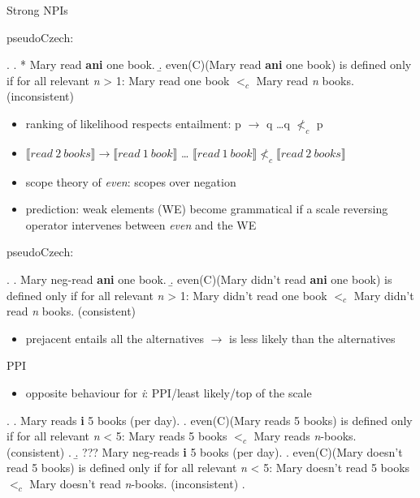 \documentclass[ignorenonframetext,]{beamer}
\providecommand{\tightlist}{%
  \setlength{\itemsep}{0pt}\setlength{\parskip}{0pt}}
\begin{document}
\begin{frame}{Strong NPIs}

pseudoCzech:

\ex. \a. * Mary read \textbf{ani} one book. \b. even(C)(Mary read \textbf{ani} one book) is
defined only if for all relevant \emph{n} \textgreater{} 1: Mary read
one book \(<_c\) Mary read \emph{n} books. \hfill (inconsistent)

\begin{itemize}
\tightlist
\item
  ranking of likelihood respects entailment: p \(\rightarrow\) q
  \ldots q \(\not<_c\) p
\item
  \(\llbracket read\ 2\ books\rrbracket \rightarrow \llbracket read\ 1\ book\rrbracket\)
  \ldots{}
  \(\llbracket read\ 1\ book\rrbracket \not<_c \llbracket read\ 2\ books\rrbracket\)
\end{itemize}

\end{frame}

\begin{frame}

\begin{itemize}
\tightlist
\item
  scope theory of \emph{even}: scopes over negation
\item
  prediction: weak elements (WE) become grammatical if a scale reversing
  operator intervenes between \emph{even} and the WE
\end{itemize}

pseudoCzech:

\ex. \a. Mary neg-read \textbf{ani} one book. \b. even(C)(Mary didn't read \textbf{ani} one 
book) is defined only if for all relevant \emph{n} \textgreater{} 1:
Mary didn't read one book \(<_c\) Mary didn't read \emph{n} books.
\hfill (consistent)

\begin{itemize}
\tightlist
\item
  prejacent entails all the alternatives \(\rightarrow\) is less likely
  than the alternatives
\end{itemize}

\end{frame}

\begin{frame}{PPI}

\begin{itemize}
\tightlist

\item opposite behaviour for \textit{i}: PPI/least likely/top of the scale

\end{itemize}

\ex. \a. Mary reads \textbf{i} 5 books (per day).
\a. even(C)(Mary reads 5 books) is defined only if for all relevant \textit{n} < 5: Mary reads 5 books $<_c$ Mary reads \textit{n}-books. \hfill (consistent)
\z.
\b. ??? Mary neg-reads \textbf{i} 5 books (per day).
\a. even(C)(Mary doesn't read 5 books) is defined only if for all relevant \textit{n} < 5: Mary doesn't read 5 books $<_c$ Mary doesn't read \textit{n}-books. \hfill (inconsistent)
\z.

\end{frame}
\end{document}
